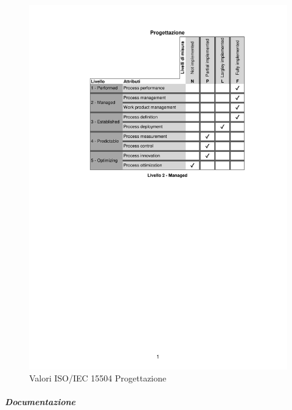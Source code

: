 \begin{figure}[H]
	\centering
	\includegraphics[scale=1]{images/resoconto/RP/progettazione-RP.pdf}
	\caption{Valori ISO/IEC 15504 Progettazione}	
\end{figure}
\newpage
\subparagraph{Documentazione}
\noindent
